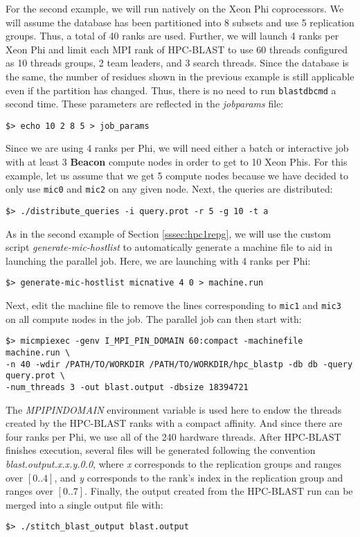 \documentclass[10pt]{article}
\newcommand{\beac}{\textbf{Beacon }}
\begin{document}
For the second example, we will run natively on the Xeon Phi coprocessors.  We will assume the database has been partitioned into 8 subsets and use 5 replication groups.  Thus, a total of 40 ranks are used.
Further, we will launch 4 ranks per Xeon Phi and limit each MPI rank of HPC-BLAST to use 60 threads configured as 10 threads groups, 2 team leaders, and 3 search threads.
Since the database is the same, the number of residues shown in the previous example is still applicable even if the partition has changed. Thus, there is no need to run \verb^blastdbcmd^ a second time.
These parameters are reflected in the \emph{job\textunderscore params} file:
\begin{verbatim}
$> echo 10 2 8 5 > job_params
\end{verbatim}
\noindent Since we are using 4 ranks per Phi, we will need either a batch or interactive job with at least 3 \beac compute nodes in order to get to 10 Xeon Phis.  For this example, let us assume that we get 5 compute nodes because we have decided
to only use \verb^mic0^ and \verb^mic2^ on any given node.  Next, the queries are distributed:
\begin{verbatim}
$> ./distribute_queries -i query.prot -r 5 -g 10 -t a
\end{verbatim}
\noindent As in the second example of Section \ref{sssec:hpc1repg}, we will use the custom script \emph{generate-mic-hostlist} to automatically generate a machine file to aid in launching the parallel job.  Here, we are launching with 4 ranks per Phi:
\begin{verbatim}
$> generate-mic-hostlist micnative 4 0 > machine.run
\end{verbatim}
\noindent Next, edit the machine file to remove the lines corresponding to \verb^mic1^ and \verb^mic3^ on all compute nodes in the job.  The parallel job can then start with:
\begin{verbatim}
$> micmpiexec -genv I_MPI_PIN_DOMAIN 60:compact -machinefile machine.run \
-n 40 -wdir /PATH/TO/WORKDIR /PATH/TO/WORKDIR/hpc_blastp -db db -query query.prot \
-num_threads 3 -out blast.output -dbsize 18394721
\end{verbatim}
\noindent The \emph{MPI\textunderscore PIN\textunderscore DOMAIN} environment variable is used here to endow the threads created by the HPC-BLAST ranks with a compact affinity.  And since there are four ranks per Phi, we use all of the 240 hardware threads.
After HPC-BLAST finishes execution, several files will be generated following the convention 
\emph{blast.output.x.x.y.0.0}, where  \emph{x} corresponds to the replication groups and ranges over \([0..4]\), and \emph{y} corresponds to the rank's index in the replication group
and ranges over \([0..7]\).
Finally, the output created from the HPC-BLAST run can be merged into a single output file with:
\begin{verbatim}
$> ./stitch_blast_output blast.output
\end{verbatim}
\end{document}
